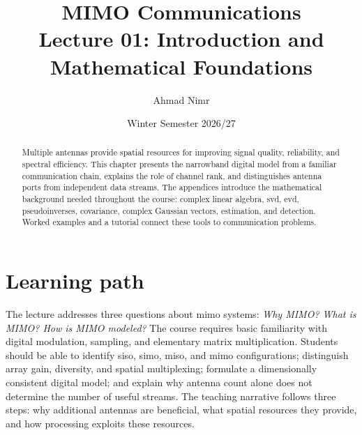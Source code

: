 



\title{MIMO Communications\\Lecture 01: Introduction and Mathematical Foundations}
\author{Ahmad Nimr}
\date{Winter Semester 2026/27}


\maketitle
\begin{abstract}
Multiple antennas provide spatial resources for improving signal quality, reliability, and spectral efficiency. This chapter presents the narrowband digital model from a familiar communication chain, explains the role of channel rank, and distinguishes antenna ports from independent data streams. The appendices introduce the mathematical background needed throughout the course: complex linear algebra, \ac{svd}, \ac{evd}, pseudoinverses, covariance, complex Gaussian vectors, estimation, and detection. Worked examples and a tutorial connect these tools to communication problems.
\end{abstract}
\tableofcontents
\acresetall
\newpage
\section{Learning path}
The lecture addresses three questions about \ac{mimo} systems: 
\emph{Why MIMO? What is MIMO? How is MIMO  modeled?} The course requires basic familiarity with digital modulation, sampling, and elementary matrix multiplication. Students should be able to identify \ac{siso}, \ac{simo}, \ac{miso}, and \ac{mimo} configurations; distinguish array gain, diversity, and spatial multiplexing; formulate a dimensionally consistent digital model; and explain why antenna count alone does not determine the number of useful streams. The teaching narrative follows three steps: why additional antennas are beneficial, what spatial resources they provide, and how processing exploits these resources.

